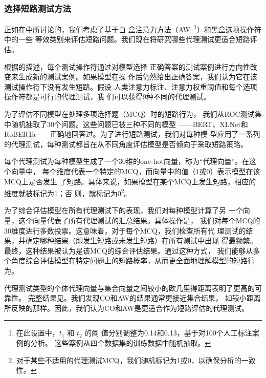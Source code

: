 \subsubsection*{选择短路测试方法}
\label{sec3:select-sc}

正如在中所讨论的，我们考虑了基于白
盒注意力方法（AW~\footnote{在此设置中，$t_1$ 和 $t_2$ 的阈
值分别调整为0.14和0.13，基于对100个人工标注案例的分析。
这些案例从四个数据集的训练数据中随机抽取。}）和黑盒选项操作符中的一些
等效类别来评估短路问题。我们现在将研究哪些代理测试更适合短路评估。

根据的描述，每个测试操作符通过对模型选择
正确答案的测试案例进行方向性改变来生成新的测试案例。如果模型在操
作后仍然给出正确答案，我们认为它在该测试操作符下没有发生短路。假设
人类注意力标注、注意力权重阈值和每个选项操作符都是可行的代理测试，我
们可以获得9种不同的代理测试。

为了评估不同模型在处理多项选择题（MCQ）时的短路行为，
我们从ROC测试集中随机抽取了30个问题。这些问题已被三种不同的模型
——BERT、XLNet和RoBERTa——正确地回答过。为了进行短路测试，我们对每种模
型应用了一系列的代理测试，每种测试都旨在从不同角度评估模型是否倾向于采取短路策略。

每个代理测试为每种模型生成了一个30维的one-hot向量，称为``代理向量''。在这个向量中，
每个维度代表一个特定的MCQ，而向量中的值（1或0）表示模型在该MCQ上是否发生
了短路。具体来说，如果模型在某个MCQ上发生短路，相应的维度就被标记为1；否
则，就标记为0\footnote{对于某些不适用的代理测试MCQ，我们随机标记为1或0，以确保分析的一致性。}。

为了综合评估模型在所有代理测试下的表现，我们对每种模型计算了另
一个向量，这个向量代表了所有代理测试的汇总结果。具体操作是，
我们对每个MCQ的30维度进行多数投票。这意味着，对于每个MCQ，我们检查所有代
理测试的结果，并确定哪种结果（即发生短路或未发生短路）在所有测试中出现
得最频繁。最终，这种结果被认为是该MCQ的综合评估结果。通过这种方式，
我们能够从多个角度综合评估模型在特定问题上的短路概率，从而更全面地理解模型的短路行为。


代理测试类型的个体代理向量与集合向量之间较小的欧几里得距离表明了更高的可靠性。
完整结果见。我们发现CO和AW的结果通常更接近集合结果，
如较小距离所反映的那样。因此，我们认为CO和AW是更适合作为短路评估的代理测试。



